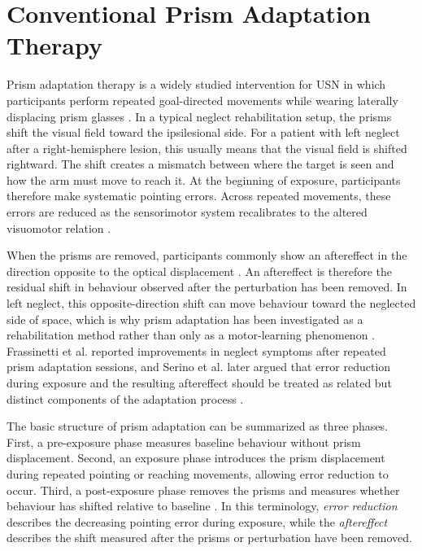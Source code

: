 \section{Conventional Prism Adaptation Therapy}
\label{sec:background-prism-therapy}

Prism adaptation therapy is a widely studied intervention for USN in which participants perform repeated goal-directed movements while wearing laterally displacing prism glasses \cite{Rossetti1998Prism,frassinetti2002long,serino2006mechanisms,Serino2011}. In a typical neglect rehabilitation setup, the prisms shift the visual field toward the ipsilesional side. For a patient with left neglect after a right-hemisphere lesion, this usually means that the visual field is shifted rightward. The shift creates a mismatch between where the target is seen and how the arm must move to reach it. At the beginning of exposure, participants therefore make systematic pointing errors. Across repeated movements, these errors are reduced as the sensorimotor system recalibrates to the altered visuomotor relation \cite{serino2006mechanisms,Serino2011}.

When the prisms are removed, participants commonly show an aftereffect in the direction opposite to the optical displacement \cite{Rossetti1998Prism,frassinetti2002long,serino2006mechanisms}. An aftereffect is therefore the residual shift in behaviour observed after the perturbation has been removed. In left neglect, this opposite-direction shift can move behaviour toward the neglected side of space, which is why prism adaptation has been investigated as a rehabilitation method rather than only as a motor-learning phenomenon \cite{Rossetti1998Prism,frassinetti2002long}. Frassinetti et al. reported improvements in neglect symptoms after repeated prism adaptation sessions, and Serino et al. later argued that error reduction during exposure and the resulting aftereffect should be treated as related but distinct components of the adaptation process \cite{frassinetti2002long,serino2006mechanisms}.

The basic structure of prism adaptation can be summarized as three phases. First, a pre-exposure phase measures baseline behaviour without prism displacement. Second, an exposure phase introduces the prism displacement during repeated pointing or reaching movements, allowing error reduction to occur. Third, a post-exposure phase removes the prisms and measures whether behaviour has shifted relative to baseline \cite{Rossetti1998Prism,frassinetti2002long,Serino2011}. In this terminology, \emph{error reduction} describes the decreasing pointing error during exposure, while the \emph{aftereffect} describes the shift measured after the prisms or perturbation have been removed.

